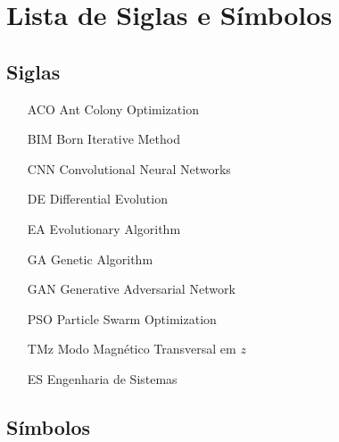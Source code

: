
\newpage
\chapter*{Lista de Siglas e Símbolos} %

	\section*{Siglas}
	
		\begin{itemize}[labelwidth=5em,leftmargin=\dimexpr{}+\relax,align=left]
			\item[ACO] Ant Colony Optimization
			\item[BIM] Born Iterative Method
			\item[CNN] Convolutional Neural Networks
			\item[DE] Differential Evolution
			\item[EA] Evolutionary Algorithm
			\item[GA] Genetic Algorithm
			\item[GAN] Generative Adversarial Network
			\item[PSO] Particle Swarm Optimization
			\item[TMz] Modo Magnético Transversal em $z$
			\item[ES] Engenharia de Sistemas 
		\end{itemize}
	
		\thispagestyle{empty}

	\section*{Símbolos}
	
		\thispagestyle{empty}
	
